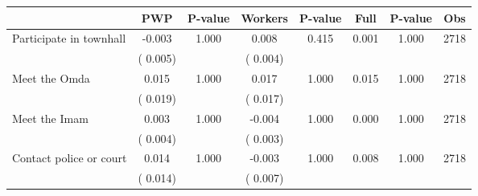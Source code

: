 
\begin{tabular}{l*{7}{c}}\hline&\multicolumn{1}{c}{PWP}&\multicolumn{1}{c}{P-value}&\multicolumn{1}{c}{Workers}&\multicolumn{1}{c}{P-value}&\multicolumn{1}{c}{Full}&\multicolumn{1}{c}{P-value}&\multicolumn{1}{c}{Obs} \\ \hline

 Participate in townhall       &             -0.003       &        1.000  &              0.008       &        0.415  &              0.001       &              1.000 &  2718 \\ 
                       &       (       0.005)             &                               &       (       0.004)                     &                               &                                               &                                &                      \\ 

 Meet the Omda       &              0.015       &        1.000  &              0.017       &        1.000  &              0.015       &              1.000 &  2718 \\ 
                       &       (       0.019)             &                               &       (       0.017)                     &                               &                                               &                                &                      \\ 

 Meet the Imam       &              0.003       &        1.000  &             -0.004       &        1.000  &              0.000       &              1.000 &  2718 \\ 
                       &       (       0.004)             &                               &       (       0.003)                     &                               &                                               &                                &                      \\ 

 Contact police or court       &              0.014       &        1.000  &             -0.003       &        1.000  &              0.008       &              1.000 &  2718 \\ 
                       &       (       0.014)             &                               &       (       0.007)                     &                               &                                               &                                &                      \\ 


\end{tabular}
